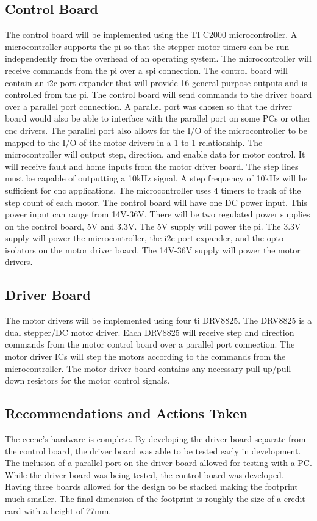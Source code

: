 \subsection{Control Board}
The control board will be implemented using the TI C2000 microcontroller.
A microcontroller supports the \gls{pi} so that the stepper motor timers can be run independently from the overhead of an operating system.
The microcontroller will receive commands from the \gls{pi} over a \gls{spi} connection.
The control board will contain an \gls{i2c} port expander that will provide 16 general purpose outputs and is controlled from the \gls{pi}.
The control board will send commands to the driver board over a parallel port connection.
A parallel port was chosen so that the driver board would also be able to interface with the parallel port on some PCs or other \gls{cnc} drivers.
The parallel port also allows for the I/O of the microcontroller to be mapped to the I/O of the motor drivers in a 1-to-1 relationship.
The microcontroller will output step, direction, and enable data for motor control.
It will receive fault and home inputs from the motor driver board.
The step lines must be capable of outputting a 10kHz signal.
A step frequency of 10kHz will be sufficient for \gls{cnc} applications.
The microcontroller uses 4 timers to track of the step count of each motor. 
The control board will have one DC power input.
This power input can range from 14V-36V.
There will be two regulated power supplies on the control board, 5V and 3.3V.
The 5V supply will power the \gls{pi}.
The 3.3V supply will power the microcontroller, the \gls{i2c} port expander, and the opto-isolators on the motor driver board.
The 14V-36V supply will power the motor drivers.

\subsection{Driver Board}
The motor drivers will be implemented using four \gls{ti} DRV8825.
The DRV8825 is a dual stepper/DC motor driver.
Each DRV8825 will receive step and direction commands from the motor control board over a parallel port connection.
The motor driver ICs will step the motors according to the commands from the microcontroller.
The motor driver board contains any necessary pull up/pull down resistors for the motor control signals.

\subsection{Recommendations and Actions Taken}
The \gls{ceenc}'s hardware is complete.
By developing the driver board separate from the control board, the driver board was able to be tested early in development.
The inclusion of a parallel port on the driver board allowed for testing with a PC.
While the driver board was being tested, the control board was developed.
Having three boards allowed for the design to be stacked making the footprint much smaller.
The final dimension of the footprint is roughly the size of a credit card with a height of 77mm.

